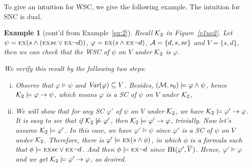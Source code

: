\documentclass{article}
\newtheorem{example}{Example}
\begin{document}

To give an intuition for WSC, we give the following example. The intuition for SNC is dual.

\begin{example}[cont'd from Example~\ref{ex:2}]\label{examp:WSC}
Recall ${\cal K}_2$ in Figure~\ref{v1uv2}. Let $\psi = \textsc{e} \textsc{x}(s \wedge (\textsc{e} \textsc{x} se \vee \textsc{e} \textsc{x} \neg d))$, $\varphi = \textsc{e} \textsc{x}(s \wedge \textsc{e} \textsc{x} \neg d)$, ${\cal A} =\{d, s, se\}$ and $V = \{s, d\}$, then we can check  that the WSC of $\psi$ on $V$ under ${\cal K}_2$ is $\varphi$.

We verify this result by the following two steps:
\begin{enumerate}[(i)]
  \item Observe that $\varphi \models \psi$ and $\textit{Var}(\varphi) \subseteq V$. Besides, $({\cal M}, s_0) \models \varphi \wedge \psi$, hence ${\cal K}_2 \models \varphi \rightarrow \psi$, which means $\varphi$ is a SC of $\psi$ on $V$ under ${\cal K}_2$,
  \item We will show that for any SC $\varphi'$ of $\psi$ on $V$ under ${\cal K}_2$,  we have ${\cal K}_2 \models \varphi' \rightarrow \varphi$. It is easy to see that if ${\cal K}_2 \not \models \varphi'$, then ${\cal K}_2\models \varphi' \rightarrow \varphi$, trivially. Now let's assume ${\cal K}_2 \models \varphi'$. In this case, we have $\varphi' \models \psi$ since $\varphi'$ is a SC of $\psi$ on $V$ under ${\cal K}_2$. Therefore, there is $\varphi' \models \textsc{e} \textsc{x}(s \wedge \phi)$, in which $\phi$ is a formula such that $\phi\models \textsc{e} \textsc{x} se \vee \textsc{e} \textsc{x} \neg d$. And then $\phi \models \textsc{e} \textsc{x} \neg d$ since $\textrm{IR}(\varphi', \overline V)$. Hence, $\varphi' \models \varphi$ and we get  ${\cal K}_2 \models \varphi' \rightarrow \varphi$, as desired.
\end{enumerate}
\end{example}
\end{document}
